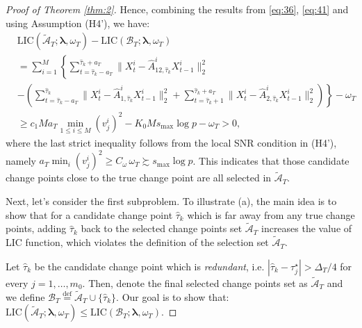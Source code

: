 \documentclass[11pt]{article}
\begin{document}
\begin{proof}[Proof of Theorem \ref{thm:2}]
Hence, combining the results from \eqref{eq:36}, \eqref{eq:41} and using Assumption (H4'), we have:
\begin{equation}
    \label{eq:42}
    \begin{aligned}
        &\text{LIC}(\widetilde{\mathcal{A}}_T; \bm{\lambda}, \omega_T) - \text{LIC}(\mathcal{B}_T; \bm{\lambda}, \omega_T) \\
        &= \sum_{i=1}^M \left\{ \sum_{t=\widehat{\tau}_k-a_T}^{\widehat{\tau}_k+a_T}\|X_t^i - \widehat{A}^i_{12,\widehat{\tau}_k}X_{t-1}^i\|_2^2 \right. \\
        &- \left.\left(\sum_{t=\widehat{\tau}_k-a_T}^{\widehat{\tau}_k}\|X_t^i - \widehat{A}_{1,\widehat{\tau}_k}^iX_{t-1}^i\|_2^2 + \sum_{t=\widehat{\tau}_k+1}^{\widehat{\tau}_k+a_T}\|X_t^i - \widehat{A}_{2,\widehat{\tau}_k}^iX_{t-1}^i\|_2^2\right) \right\} - \omega_T \\
        &\geq c_1 M a_T \min_{1\leq i \leq M}(v_j^i)^2 - K_0 M s_{\max}\log p - \omega_T > 0,
    \end{aligned}
\end{equation}
where the last strict inequality follows from the local SNR condition in (H4'), namely $a_T \min_i (v_j^i)^2 \geq C_\omega\,\omega_T \succsim s_{\max}\log p$. This indicates that those candidate change points close to the true change point are all selected in $\widetilde{\mathcal{A}}_T$.


Next, let's consider the first subproblem. To illustrate (a), the main idea is to show that for a candidate change point $\widehat{\tau}_k$ which is far away from any true change points, adding $\widehat{\tau}_k$ back to the selected change points set $\widetilde{\mathcal{A}}_T$ increases the value of LIC function, which violates the definition of the selection set $\widetilde{\mathcal{A}}_T$.

Let $\widehat{\tau}_k$ be the candidate change point which is \emph{redundant}, i.e. $|\widehat{\tau}_k - \tau_j^\star| > \Delta_T/4$ for every $j=1,\dots,m_0$. Then, denote the final selected change points set as $\widetilde{\mathcal{A}}_T$ and we define $\mathcal{B}_T \overset{\text{def}}{=} \widetilde{\mathcal{A}}_T \cup \{\widehat{\tau}_k\}$. Our goal is to show that: $\text{LIC}(\widetilde{\mathcal{A}}_T; \bm{\lambda}, \omega_T) \leq \text{LIC}(\mathcal{B}_T; \bm{\lambda}, \omega_T)$.


\end{proof}
\end{document}
